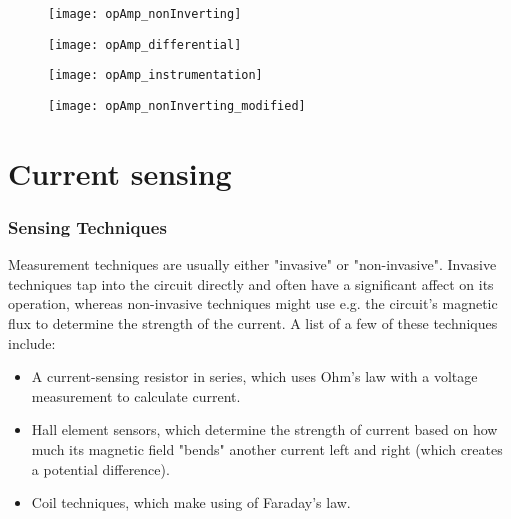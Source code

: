 \begin{figure}[!h]
    \centering
    \begin{minipage}{.23\textwidth}
        \centering
        \texttt{[image: opAmp\_nonInverting]}
        \label{fig:opamp-non-inverting}
    \end{minipage}
    \begin{minipage}{.23\textwidth}
        \centering
        \texttt{[image: opAmp\_differential]}
        \label{fig:opamp-differential}
    \end{minipage}
    \begin{minipage}{.23\textwidth}
        \centering
        \texttt{[image: opAmp\_instrumentation]}
        \label{fig:opamp-instrumentation}
    \end{minipage}
    \begin{minipage}{.23\textwidth}
        \centering
        \texttt{[image: opAmp\_nonInverting\_modified]}
        \label{fig:opamp-non-inverting-filter}
    \end{minipage}    

\end{figure}

\pagebreak
\section{Current sensing}\label{sec:cursens}

\subsubsection{Sensing Techniques}\label{sec:cur_sum}
Measurement techniques are usually either "invasive" or "non-invasive". Invasive techniques tap into the circuit directly and often have a significant affect
on its operation, whereas non-invasive techniques might use e.g. the circuit's magnetic flux to determine the strength of the current.
A list of a few of these techniques \cite{WebsiteHiokiUSA} include:
\begin{itemize}
    \item A current-sensing resistor in series, which uses Ohm's law with a voltage measurement to calculate current.
    \item Hall element sensors, which determine the strength of current based on how much its magnetic field "bends" another current left and right (which creates a potential difference).
    \item Coil techniques, which make using of Faraday's law.
\end{itemize}

